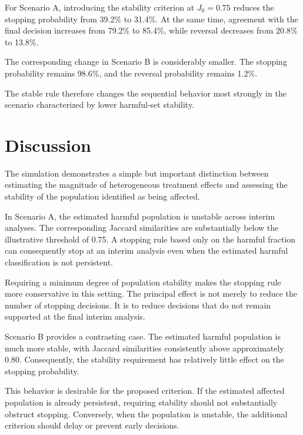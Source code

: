 \documentclass[11pt,a4paper]{article}
\begin{document}
For Scenario A, introducing the stability criterion at $J_0=0.75$ reduces
the stopping probability from 39.2\% to 31.4\%. At the same time, agreement
with the final decision increases from 79.2\% to 85.4\%, while reversal
decreases from 20.8\% to 13.8\%.

The corresponding change in Scenario B is considerably smaller. The stopping
probability remains 98.6\%, and the reversal probability remains 1.2\%.

The stable rule therefore changes the sequential behavior most strongly in
the scenario characterized by lower harmful-set stability.


\section{Discussion}

The simulation demonstrates a simple but important distinction between
estimating the magnitude of heterogeneous treatment effects and assessing the
stability of the population identified as being affected.

In Scenario A, the estimated harmful population is unstable across interim
analyses. The corresponding Jaccard similarities are substantially below the
illustrative threshold of 0.75. A stopping rule based only on the harmful
fraction can consequently stop at an interim analysis even when the estimated
harmful classification is not persistent.

Requiring a minimum degree of population stability makes the stopping rule
more conservative in this setting. The principal effect is not merely to
reduce the number of stopping decisions. It is to reduce decisions that do
not remain supported at the final interim analysis.

Scenario B provides a contrasting case. The estimated harmful population is
much more stable, with Jaccard similarities consistently above approximately
0.80. Consequently, the stability requirement has relatively little effect
on the stopping probability.

This behavior is desirable for the proposed criterion. If the estimated
affected population is already persistent, requiring stability should not
substantially obstruct stopping. Conversely, when the population is unstable,
the additional criterion should delay or prevent early decisions.
\end{document}
